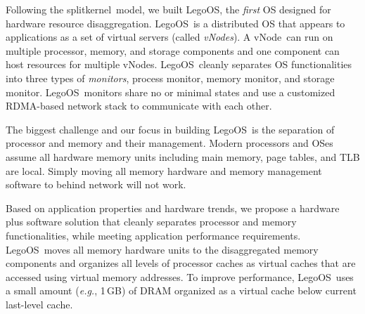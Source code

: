 \documentclass[10pt,times,twocolumn]{z2-article}
\renewcommand{\em}{\it}
\newcommand{\eg}{\textit{e.g.}}
\newcommand{\GB}{\,GB}
\newcommand{\splitkernel}{splitkernel}
\newcommand{\lego}{LegoOS}
\newcommand{\vnode}{vNode}
\newcommand{\microos}{monitor}
\begin{document}
Following the \splitkernel\ model, 
we built \lego, the {\em first} OS designed for hardware resource disaggregation.
\lego\ is a distributed OS that appears to applications as a set of virtual servers (called {\em \vnode{}s}).
A \vnode\ can run on multiple processor, memory, and storage components
and one component can host resources for multiple \vnode{}s.
\lego\ cleanly separates OS functionalities into %
three types of {\em \microos{}s},
process \microos, memory \microos, and storage \microos. %
\lego\ \microos{}s share no or minimal states
and use a customized RDMA-based network stack to communicate with each other.

The biggest challenge and our focus in building \lego\ is the separation of processor and memory and their management.
Modern processors and OSes assume all hardware memory units including main memory, page tables, and TLB are local.
Simply moving all memory hardware and memory management software to behind network will not work.

Based on application properties and hardware trends, 
we propose a hardware plus software solution that cleanly separates processor and memory functionalities,
while meeting application performance requirements.
\lego\ moves all memory hardware units to the disaggregated memory components
and organizes all levels of processor caches as virtual caches that are accessed using virtual memory addresses. 
To improve performance, \lego\ uses a small amount (\eg, 1\GB) of DRAM
organized as a virtual cache below current last-level cache.
\end{document}
